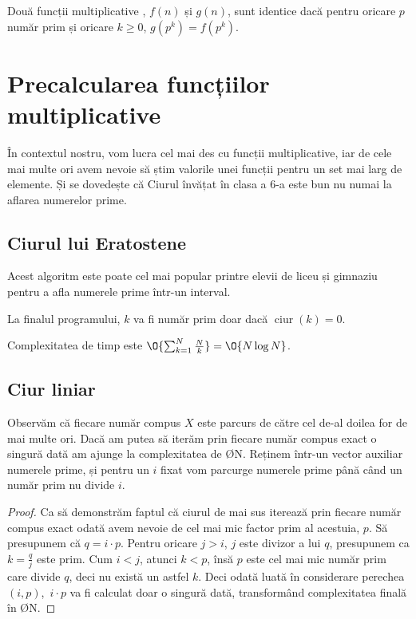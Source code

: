 \begin{definition}
    Două funcții multiplicative , $f(n)$ și $g(n) $,  sunt identice dacă pentru oricare $p$ număr prim și oricare $k \geq 0$, $g(p^k) = f(p^k)$.
\end{definition}
\section{Precalcularea funcțiilor multiplicative}
În contextul nostru, vom lucra cel mai des cu funcții multiplicative, iar de cele mai multe ori avem nevoie să știm valorile unei funcții pentru un set mai larg de elemente. Și se dovedește că Ciurul învățat în clasa a 6-a este bun nu numai la aflarea numerelor prime.

\subsection{Ciurul lui Eratostene}
Acest algoritm este poate cel mai popular printre elevii de liceu și gimnaziu pentru a afla numerele prime într-un interval. 

La finalul programului, $k$ va fi număr prim doar dacă $\operatorname{ciur}(k) = 0$.

Complexitatea de timp este $\O{\sum_{k=1}^N \frac{N}{k}} = \O{N \log{N}}$. 
\subsection{Ciur liniar} 
Observăm că fiecare număr compus $X$ este parcurs de către cel de-al doilea for de mai multe ori. Dacă am putea să iterăm prin fiecare număr compus exact o singură dată am ajunge la complexitatea de \O{N}. Reținem într-un vector auxiliar numerele prime, și pentru un $i$ fixat vom parcurge numerele prime până când un număr prim nu divide $i$.
\begin{proof}
    Ca să demonstrăm faptul că ciurul de mai sus iterează prin fiecare număr compus exact odată avem nevoie de cel mai mic factor prim al acestuia, $p$. Să presupunem că $q = i \cdot p$. Pentru oricare $j > i$, $j$ este divizor a lui  $q$, presupunem ca $k = \frac{q}{j}$ este prim. Cum $i < j$, atunci $k < p$, însă $p$ este cel mai mic număr prim care divide $q$, deci nu există un astfel $k$. Deci odată luată în considerare perechea $(i, p)$,\, $i \cdot p$ va fi calculat doar o singură dată, transformând complexitatea finală în \O{N}.
\end{proof}


